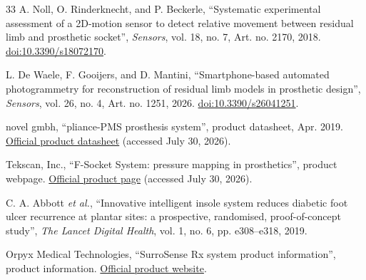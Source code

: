 \begin{thebibliography}{33}
A. Noll, O. Rinderknecht, and P. Beckerle,
\textquotedblleft Systematic experimental assessment of a 2D-motion sensor to
detect relative movement between residual limb and prosthetic
socket\textquotedblright,
\textit{Sensors}, vol. 18, no. 7, Art. no. 2170, 2018.
\href{https://doi.org/10.3390/s18072170}
{doi:10.3390/s18072170}.

L. De Waele, F. Gooijers, and D. Mantini,
\textquotedblleft Smartphone-based automated photogrammetry for reconstruction
of residual limb models in prosthetic design\textquotedblright,
\textit{Sensors}, vol. 26, no. 4, Art. no. 1251, 2026.
\href{https://doi.org/10.3390/s26041251}
{doi:10.3390/s26041251}.

novel gmbh,
\textquotedblleft pliance-PMS prosthesis system\textquotedblright,
product datasheet, Apr. 2019.
\href{https://www.novel.de/wp-content/uploads/2019/06/pliance_prosthesis_PMS_en_web.pdf}
{Official product datasheet} (accessed July 30, 2026).

Tekscan, Inc.,
\textquotedblleft F-Socket System: pressure mapping in prosthetics\textquotedblright,
product webpage.
\href{https://www.tekscan.com/products-solutions/systems/f-socket-system}
{Official product page} (accessed July 30, 2026).

C. A. Abbott \textit{et al.},
\textquotedblleft Innovative intelligent insole system reduces diabetic foot
ulcer recurrence at plantar sites: a prospective, randomised, proof-of-concept
study\textquotedblright,
\textit{The Lancet Digital Health}, vol. 1, no. 6, pp. e308--e318, 2019.

Orpyx Medical Technologies,
\textquotedblleft SurroSense Rx system product information\textquotedblright,
product information. \href{https://orpyx.com}{Official product website}.

\end{thebibliography}
\endgroup
